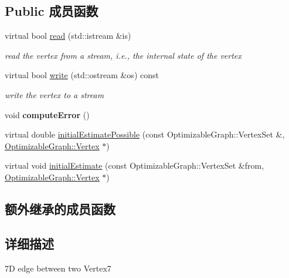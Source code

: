 \subsection*{Public 成员函数}
\begin{DoxyCompactItemize}
\item 
\hypertarget{classg2o_1_1EdgeSim3_a6c7ad669fa04265475cbfdba3452fcbd}{virtual bool \hyperlink{classg2o_1_1EdgeSim3_a6c7ad669fa04265475cbfdba3452fcbd}{read} (std\-::istream \&is)}\label{classg2o_1_1EdgeSim3_a6c7ad669fa04265475cbfdba3452fcbd}

\begin{DoxyCompactList}\small\item\em read the vertex from a stream, i.\-e., the internal state of the vertex \end{DoxyCompactList}\item 
\hypertarget{classg2o_1_1EdgeSim3_a50f9e0b48bd9143eb516be36e0c25340}{virtual bool \hyperlink{classg2o_1_1EdgeSim3_a50f9e0b48bd9143eb516be36e0c25340}{write} (std\-::ostream \&os) const }\label{classg2o_1_1EdgeSim3_a50f9e0b48bd9143eb516be36e0c25340}

\begin{DoxyCompactList}\small\item\em write the vertex to a stream \end{DoxyCompactList}\item 
\hypertarget{classg2o_1_1EdgeSim3_a68f55d11f6b8b210318f167d04722a8b}{void {\bfseries compute\-Error} ()}\label{classg2o_1_1EdgeSim3_a68f55d11f6b8b210318f167d04722a8b}

\item 
virtual double \hyperlink{classg2o_1_1EdgeSim3_a0fd73623327838b46abdf292582da6ae}{initial\-Estimate\-Possible} (const Optimizable\-Graph\-::\-Vertex\-Set \&, \hyperlink{classg2o_1_1OptimizableGraph_1_1Vertex}{Optimizable\-Graph\-::\-Vertex} $\ast$)
\item 
virtual void \hyperlink{classg2o_1_1EdgeSim3_afac4cc093af6f54adb278c142f33dcca}{initial\-Estimate} (const Optimizable\-Graph\-::\-Vertex\-Set \&from, \hyperlink{classg2o_1_1OptimizableGraph_1_1Vertex}{Optimizable\-Graph\-::\-Vertex} $\ast$)
\end{DoxyCompactItemize}
\subsection*{额外继承的成员函数}


\subsection{详细描述}
7\-D edge between two Vertex7 

